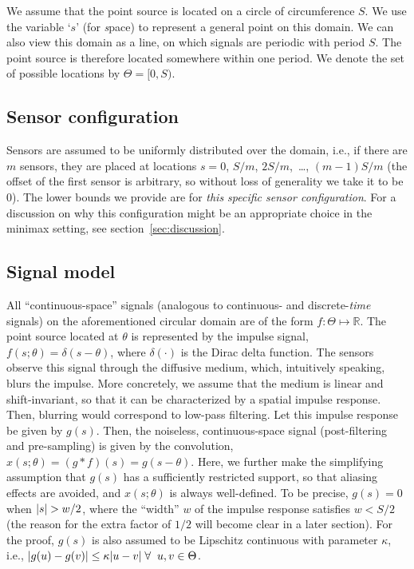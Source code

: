 \documentclass[conference,letterpaper]{IEEEtran}
\DeclarePairedDelimiter\abs{\lvert}{\rvert}
\begin{document}
We assume that the point source is located on a circle of circumference $S$. We
use the variable `$s$' (for \emph{s}pace) to represent a general point on this
domain. We can also view this domain as a line, on which signals are periodic
with period $S$.  The point source is therefore located somewhere within one
period. We denote the set of possible locations by $\Theta = [0, S)$.

\subsection{Sensor configuration}

Sensors are assumed to be uniformly distributed over the domain, i.e., if there
are $m$ sensors, they are placed at locations $s = 0$, $S/m$, $2S/m$,~\dots,
$(m{-}1)S/m$ (the offset of the first sensor is arbitrary, so without loss of
generality we take it to be 0). The lower bounds we provide are for \emph{this
	specific sensor configuration}. For a discussion on why this configuration
might be an appropriate choice in the minimax setting, see
section~\ref{sec:discussion}.

\subsection{Signal model}
\label{sec:signal-model}

All ``continuous-space'' signals (analogous to continuous- and
discrete-\emph{time} signals) on the aforementioned circular domain are of the
form $f:\Theta\mapsto\mathbb{R}$.  The point source located at $\theta$ is
represented by the impulse signal, $f(s;\theta) = \delta(s - \theta)$, where
$\delta(\cdot)$ is the Dirac delta function.  The sensors observe this signal
through the diffusive medium, which, intuitively speaking, blurs the impulse.
More concretely, we assume that the medium is linear and shift-invariant, so
that it can be characterized by a spatial impulse response.  Then, blurring
would correspond to low-pass filtering.  Let this impulse response be given by
$g(s)$. Then, the noiseless, continuous-space signal (post-filtering and
pre-sampling) is given by the convolution, $x(s; \theta) = (g*f)(s) = g(s -
\theta)$. Here, we further make the simplifying assumption that $g(s)$ has a
sufficiently restricted support, so that aliasing effects are avoided, and
$x(s; \theta)$ is always well-defined. To be precise, $g(s) = 0$ when $\abs{s}
> w/2$, where the ``width'' $w$ of the impulse response satisfies $w < S / 2$
(the reason for the extra factor of $1/2$ will become clear in a later
section). For the proof, $g(s)$ is also assumed to be Lipschitz continuous with
parameter $\kappa$, i.e., $\abs{g(u) - g(v)} \leq \kappa \abs{u - v} \; \forall
\;\; u, v \in \Theta$.
\end{document}
